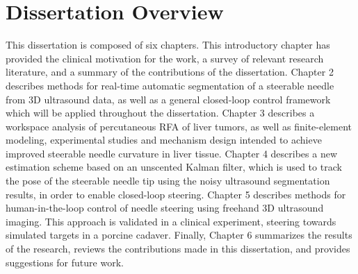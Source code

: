\section{Dissertation Overview}
This dissertation is composed of six chapters. This introductory chapter has provided the clinical motivation for the work, a survey of relevant research literature, and a summary of the contributions of the dissertation. Chapter 2 describes methods for real-time automatic segmentation of a steerable needle from 3D ultrasound data, as well as a general closed-loop control framework which will be applied throughout the dissertation. Chapter 3 describes a workspace analysis of percutaneous RFA of liver tumors, as well as finite-element modeling, experimental studies and mechanism design intended to achieve improved steerable needle curvature in liver tissue. Chapter 4 describes a new estimation scheme based on an unscented Kalman filter, which is used to track the pose of the steerable needle tip using the noisy ultrasound segmentation results, in order to enable closed-loop steering. Chapter 5 describes methods for human-in-the-loop control of needle steering using freehand 3D ultrasound imaging. This approach is validated in a clinical experiment, steering towards simulated targets in a porcine cadaver. Finally, Chapter 6 summarizes the results of the research, reviews the contributions made in this dissertation, and provides suggestions for future work.